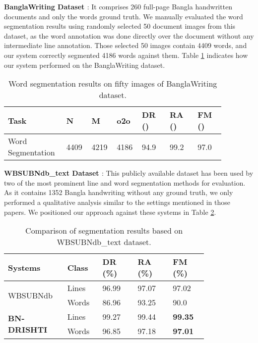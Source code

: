 \documentclass[runningheads]{llncs}
\begin{document}
\newpage
\noindent \textbf{BanglaWriting Dataset \cite{mridha2021banglawriting}}: It comprises 260 full-page Bangla handwritten documents and only the words ground truth. We manually evaluated the word segmentation results using randomly selected 50 document images from this dataset, as the word annotation was done directly over the document without any intermediate line annotation. Those selected 50 images contain 4409 words, and our system correctly segmented 4186 words against them. Table \ref{drishti-tab9} indicates how our system performed on the BanglaWriting dataset.

\begin{table}
\vspace{-4mm}
\centering
\caption{Word segmentation results on fifty images of BanglaWriting dataset.}\label{drishti-tab9}
\vspace{-2mm}
\begin{tabular}{|p{0.24\linewidth}|p{0.09\linewidth}|p{0.09\linewidth}|p{0.09\linewidth}|p{0.12\linewidth}|p{0.12\linewidth}|p{0.12\linewidth}|}
\hline
\textbf{Task} & \textbf{N} & \textbf{M} & \textbf{o2o} & \textbf{DR ()} & \textbf{RA ()} & \textbf{FM ()}\\
\hline
Word Segmentation &	4409 &	4219 &	4186 &	94.9 &	99.2 &	97.0\\
\hline
\end{tabular}
\vspace{-4mm}
\end{table}


\noindent \textbf{WBSUBNdb\_text Dataset \cite{halder2018content}}: This publicly available dataset has been used by two of the most prominent line \cite{rakshit2023generalized} and word \cite{agarwal2022word} segmentation methods for evaluation. As it contains 1352 Bangla handwriting without any ground truth, we only performed a qualitative analysis similar to the settings mentioned in those papers. We positioned our approach against these systems in Table \ref{drishti-tab10}.   

\begin{table}[h]
\vspace{-4mm}
\centering
\caption{Comparison of segmentation results based on WBSUBNdb\_text dataset.}\label{drishti-tab10}
\vspace{-1mm}
\begin{tabular}
{|p{0.20\linewidth}|p{0.15\linewidth}|p{0.15\linewidth}|p{0.15\linewidth}|p{0.15\linewidth}|}
\hline
\textbf{Systems} & \textbf{Class} & \textbf{DR (\%)} & \textbf{RA (\%)} & \textbf{FM (\%)} \\
\hline
\multirow{2}{*}{WBSUBNdb} & Lines \cite{rakshit2023generalized} & 96.99 & 97.07 & 97.02 \\ \cline{2-5}
 & Words \cite{agarwal2022word} & 86.96 & 93.25 & 90.0 \\
\hline
\multirow{2}{*}{\textbf{BN-DRISHTI}} & Lines & 99.27 & 99.44 & \textbf{99.35} \\\cline{2-5}
 & Words & 96.85 & 97.18 & \textbf{97.01} \\
 \hline
\end{tabular}
\vspace{-8mm}
\end{table}
\end{document}

